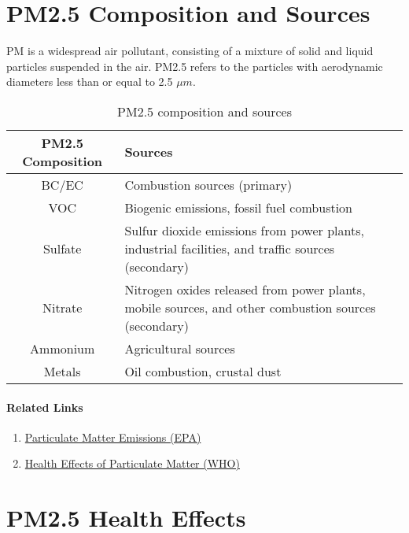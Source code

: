 \documentclass[11pt]{article}
\begin{document}
\section{PM2.5 Composition and Sources}

PM is a widespread air pollutant, consisting of a mixture of solid and liquid particles suspended in the air. PM2.5 refers to the particles with aerodynamic diameters less than or equal to 2.5 $\mu m$.

\begin{table}[h!]
    \centering
    \begin{tabular}{|c|p{}|}
        \hline
        \textbf{PM2.5 Composition} & \textbf{Sources}  \\
        \hline
        BC/EC & Combustion sources (primary) \\
        \hline
        VOC & Biogenic emissions, fossil fuel combustion \\
        \hline
        Sulfate &  Sulfur dioxide emissions from power plants, industrial facilities, and traffic sources (secondary) \\
        \hline
        Nitrate & Nitrogen oxides released from power plants, mobile sources, and other combustion sources (secondary) \\
        \hline
        Ammonium & Agricultural sources \\
        \hline 
        Metals &  Oil combustion, crustal dust \\
        \hline
    \end{tabular}
    \caption{PM2.5 composition and sources}
    \label{tab:com}
\end{table}

\paragraph{Related Links}

\begin{enumerate}
    \item \href{https://cfpub.epa.gov/roe/indicator_pdf.cfm?i=19}{Particulate Matter Emissions (EPA)}
     \item \href{http://www.euro.who.int/__data/assets/pdf_file/0006/189051/Health-effects-of-particulate-matter-final-Eng.pdf}{Health Effects of Particulate Matter (WHO)}
\end{enumerate}

\section{PM2.5 Health Effects}
\end{document}
